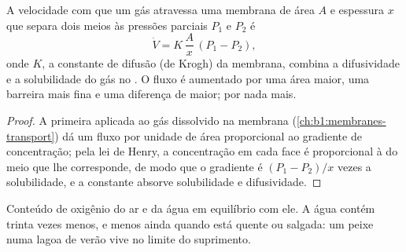 \begin{theorem}\label{thm:b1:gas-exchange:fick}
A velocidade com que um gás atravessa uma membrana de área $A$ e
espessura $x$ que separa dois meios às pressões parciais $P_1$ e $P_2$ é
\[
\dot V = K\,\frac{A}{x}\,(P_1 - P_2),
\]
onde $K$, a constante de difusão (de Krogh) da membrana, combina a
difusividade e a solubilidade do gás no . O fluxo é aumentado
por uma área maior, uma barreira mais fina e uma diferença de  maior; por nada mais.
\end{theorem}
\begin{proof}
A primeira  aplicada ao gás dissolvido na membrana
(\cref{ch:b1:membranes-transport}) dá um fluxo por unidade de área
proporcional ao gradiente de concentração; pela lei de Henry, a
concentração em cada face é proporcional à  do meio
que lhe corresponde, de modo que o gradiente é $(P_1 - P_2)/x$ vezes
a solubilidade, e a constante absorve solubilidade e difusividade.
\end{proof}

\begin{omfigure}

{\small Conteúdo de oxigênio do ar e da água em equilíbrio com ele. A
água contém trinta vezes menos, e menos ainda quando está quente ou
salgada: um peixe numa lagoa de verão vive no limite do suprimento.}
\end{omfigure}

